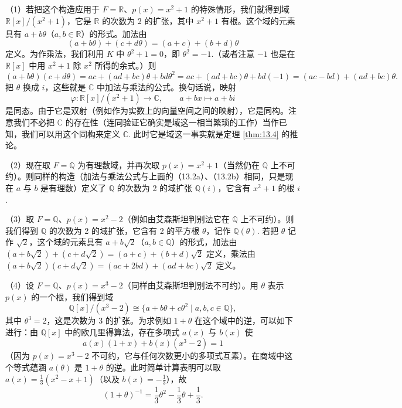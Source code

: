 \begin{example}
（1）若把这个构造应用于 \(F = \mathbb{R}\)、\(p(x) = x^2+1\) 的特殊情形，我们就得到域 \(\mathbb{R}[x]/(x^2+1)\)，它是 \(\mathbb{R}\) 的次数为 2 的扩张，其中 \(x^2+1\) 有根。这个域的元素具有 \(a+b\theta\)（\(a, b \in \mathbb{R}\)）的形式。加法由
\begin{equation}
(a+b\theta)+(c+d\theta) = (a+c)+(b+d)\theta \tag{13.2a}
\end{equation}
定义。为作乘法，我们利用 \(K\) 中 \(\theta^2+1 = 0\)，即 \(\theta^2 = -1\).（或者注意 \(-1\) 也是在 \(\mathbb{R}[x]\) 中用 \(x^2+1\) 除 \(x^2\) 所得的余式。）则
\begin{equation}
(a+b\theta)(c+d\theta) = ac+(ad+bc)\theta+bd\theta^2 = ac+(ad+bc)\theta+bd(-1) = (ac-bd)+(ad+bc)\theta. \tag{13.2b}
\end{equation}
把 \(\theta\) 换成 \(i\)，这些就是 \(\mathbb{C}\) 中加法与乘法的公式。换句话说，映射
\[
\varphi : \mathbb{R}[x]/(x^2+1) \to \mathbb{C}, \qquad a+bx \mapsto a+bi
\]
是同态。由于它是双射（例如作为实数上的向量空间之间的映射），它是同构。注意我们不必把 \(\mathbb{C}\) 的存在性（连同验证它确实是域这一相当繁琐的工作）当作已知，我们可以用这个同构来定义 \(\mathbb{C}\). 此时它是域这一事实就是定理 \ref{thm:13.4} 的推论。

（2）现在取 \(F = \mathbb{Q}\) 为有理数域，并再次取 \(p(x) = x^2+1\)（当然仍在 \(\mathbb{Q}\) 上不可约）。则同样的构造（加法与乘法公式与上面的（13.2a）、（13.2b）相同，只是现在 \(a\) 与 \(b\) 是有理数）定义了 \(\mathbb{Q}\) 的次数为 2 的域扩张 \(\mathbb{Q}(i)\)，它含有 \(x^2+1\) 的根 \(i\).

（3）取 \(F = \mathbb{Q}\)、\(p(x) = x^2-2\)（例如由艾森斯坦判别法它在 \(\mathbb{Q}\) 上不可约）。则我们得到 \(\mathbb{Q}\) 的次数为 2 的域扩张，它含有 2 的平方根 \(\theta\)，记作 \(\mathbb{Q}(\theta)\). 若把 \(\theta\) 记作 \(\sqrt{2}\)，这个域的元素具有 \(a+b\sqrt{2}\)（\(a, b \in \mathbb{Q}\)）的形式，加法由 \((a+b\sqrt{2})+(c+d\sqrt{2}) = (a+c)+(b+d)\sqrt{2}\) 定义，乘法由 \((a+b\sqrt{2})(c+d\sqrt{2}) = (ac+2bd)+(ad+bc)\sqrt{2}\) 定义。

（4）设 \(F = \mathbb{Q}\)、\(p(x) = x^3-2\)（同样由艾森斯坦判别法不可约）。用 \(\theta\) 表示 \(p(x)\) 的一个根，我们得到域
\[
\mathbb{Q}[x]/(x^3-2) \cong \{a+b\theta+c\theta^2 \mid a, b, c \in \mathbb{Q}\},
\]
其中 \(\theta^3 = 2\)，这是次数为 3 的扩张。为求例如 \(1+\theta\) 在这个域中的逆，可以如下进行：由 \(\mathbb{Q}[x]\) 中的欧几里得算法，存在多项式 \(a(x)\) 与 \(b(x)\) 使
\[
a(x)(1+x)+b(x)(x^3-2) = 1
\]
（因为 \(p(x) = x^3-2\) 不可约，它与任何次数更小的多项式互素）。在商域中这个等式蕴涵 \(a(\theta)\) 是 \(1+\theta\) 的逆。此时简单计算表明可以取 \(a(x) = \frac{1}{3}(x^2-x+1)\)（以及 \(b(x) = -\frac{1}{3}\)），故
\[
(1+\theta)^{-1} = \frac{1}{3}\theta^2-\frac{1}{3}\theta+\frac{1}{3}.
\]


\end{example}
